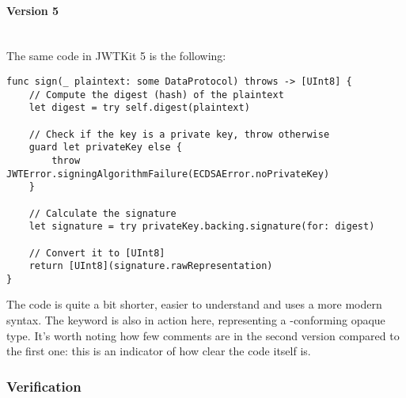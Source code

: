 \paragraph{Version 5} \mbox{} \\
The same code in JWTKit 5 is the following:
\begin{verbatim}
func sign(_ plaintext: some DataProtocol) throws -> [UInt8] {
    // Compute the digest (hash) of the plaintext
    let digest = try self.digest(plaintext)

    // Check if the key is a private key, throw otherwise
    guard let privateKey else {
        throw JWTError.signingAlgorithmFailure(ECDSAError.noPrivateKey)
    }

    // Calculate the signature
    let signature = try privateKey.backing.signature(for: digest)

    // Convert it to [UInt8]
    return [UInt8](signature.rawRepresentation)
}
\end{verbatim}
The code is quite a bit shorter, easier to understand and uses a more modern syntax. The  keyword is also in action here, representing a -conforming opaque type. It's worth noting how few comments are in the second version compared to the first one: this is an indicator of how clear the code itself is. \cite{jwtkit}

\subsubsection{Verification}
